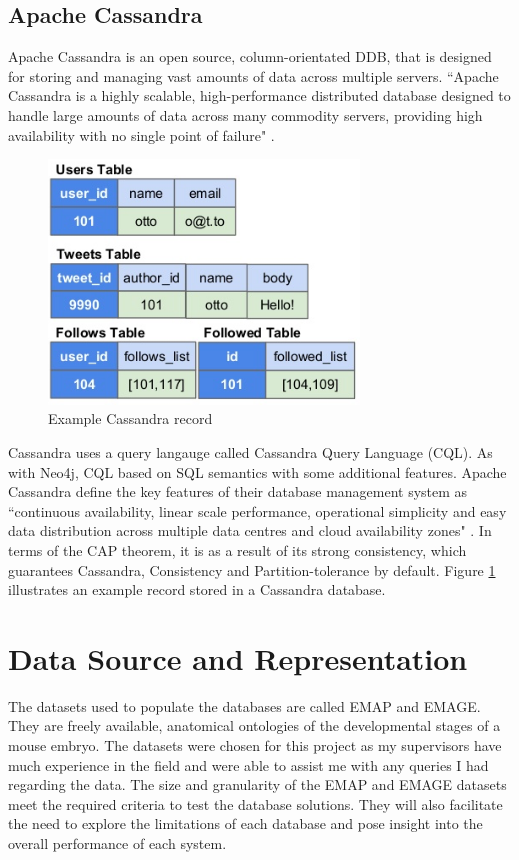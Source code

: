 \subsection{Apache Cassandra}\label{cassandra}
Apache Cassandra is an open source, column-orientated DDB, that is designed for storing and managing vast amounts of data across multiple servers. ``Apache Cassandra is a highly scalable, high-performance distributed database designed to handle large amounts of data across many commodity servers, providing high availability with no single point of failure" \cite{cassandra}. \begin{figure}[H]\begin{center}\includegraphics[height=6.5cm,width=0.6\linewidth]{images/cassandramodel}\caption{Example Cassandra record}\label{fig:cass}\end{center}\end{figure}Cassandra uses a query langauge called Cassandra Query Language (CQL). As with Neo4j, CQL based on SQL semantics with some additional features. Apache Cassandra define the key features of their database management system as ``continuous availability, linear scale performance, operational simplicity and easy data distribution across multiple data centres and cloud availability zones" \cite{cassandra}. In terms of the CAP theorem, it is as a result of its strong consistency, which guarantees Cassandra, Consistency and Partition-tolerance by default. Figure \ref{fig:cass} illustrates an example record stored in a Cassandra database.

\section{Data Source and Representation}\label{datasource}
The datasets used to populate the databases are called EMAP and EMAGE. They are freely available, anatomical ontologies of the developmental stages of a mouse embryo. The datasets were chosen for this project as my supervisors have much experience in the field and were able to assist me with any queries I had regarding the data. The size and granularity of the EMAP and EMAGE datasets meet the required criteria to test the database solutions. They will also facilitate the need to explore the limitations of each database and pose insight into the overall performance of each system.

